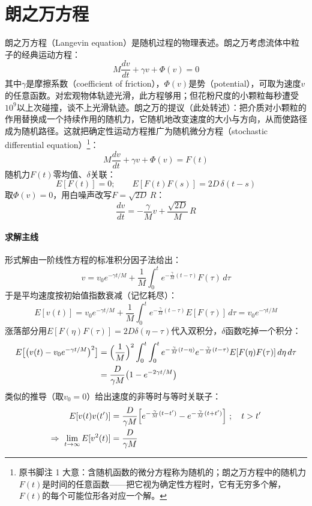 \section{朗之万方程}

朗之万方程（Langevin equation）是随机过程的物理表述。朗之万考虑流体中粒子的经典运动方程：
\begin{equation*}
M\frac{dv}{dt}+\gamma v+\Phi(v)=0
\end{equation*}
其中$\gamma$是摩擦系数（coefficient of friction），$\Phi(v)$是势（potential），可取为速度$v$的任意函数。对宏观物体轨迹光滑，此方程够用；但花粉尺度的小颗粒每秒遭受$10^9$以上次碰撞，谈不上光滑轨迹。朗之万的提议（此处转述）：把介质对小颗粒的作用替换成一个持续作用的随机力，它随机地改变速度的大小与方向，从而使路径成为随机路径。这就把确定性运动方程推广为随机微分方程（stochastic differential equation）\footnote{原书脚注 1 大意：含随机函数的微分方程称为随机的；朗之万方程中的随机力$F(t)$是时间的任意函数——把它视为确定性方程时，它有无穷多个解，$F(t)$的每个可能位形各对应一个解。}：
\begin{equation*}
M\frac{dv}{dt}+\gamma v+\Phi(v)=F(t)
\tag{A.30}
\end{equation*}
随机力$F(t)$零均值、$\delta$关联：
\begin{equation*}
E[F(t)]=0;\qquad E[F(t)F(s)]=2D\,\delta(t-s)
\end{equation*}
取$\Phi(v)=0$，用白噪声改写$F=\sqrt{2D}\,R$：
\begin{equation*}
\frac{dv}{dt}=-\frac{\gamma}{M}v+\frac{\sqrt{2D}}{M}\,R
\end{equation*}

\paragraph{求解主线}
形式解由一阶线性方程的标准积分因子法给出：
\begin{equation*}
v=v_0e^{-\gamma t/M}+\frac{1}{M}\int_0^t
e^{-\frac{\gamma}{M}(t-\tau)}F(\tau)\,d\tau
\end{equation*}
于是平均速度按初始值指数衰减（记忆耗尽）：
\begin{equation*}
E[v(t)]=v_0e^{-\gamma t/M}
+\frac{1}{M}\int_0^t e^{-\frac{\gamma}{M}(t-\tau)}
E[F(\tau)]\,d\tau=v_0e^{-\gamma t/M}
\end{equation*}
涨落部分用$E[F(\eta)F(\tau)]=2D\delta(\eta-\tau)$代入双积分，$\delta$函数吃掉一个积分：
\begin{align*}
E\bigl[\bigl(v(t)-v_0e^{-\gamma t/M}\bigr)^2\bigr]
&=\Bigl(\frac{1}{M}\Bigr)^2\int_0^t\int_0^t
e^{-\frac{\gamma}{M}(t-\eta)}e^{-\frac{\gamma}{M}(t-\tau)}
E[F(\eta)F(\tau)]\,d\eta\,d\tau\\
&=\frac{D}{\gamma M}\bigl(1-e^{-2\gamma t/M}\bigr)
\end{align*}
类似的推导（取$v_0=0$）给出速度的非等时与等时关联子：
\begin{align*}
E[v(t)v(t')]&=\frac{D}{\gamma M}
\Bigl[e^{-\frac{\gamma}{M}(t-t')}
-e^{-\frac{\gamma}{M}(t+t')}\Bigr]
\ ;\quad t>t'\\
\Rightarrow\ \lim_{t\to\infty}E[v^2(t)]&=\frac{D}{\gamma M}
\end{align*}

